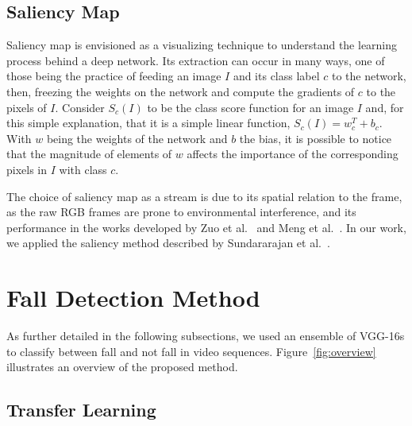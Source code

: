 \documentclass[conference]{IEEEtran}
\begin{document}
\subsection{Saliency Map}
\label{sec:saliency}

Saliency map is envisioned as a visualizing technique to understand the learning process behind a deep network. Its extraction can occur in many ways, one of those being the practice of feeding an image $I$ and its class label $c$ to the network, then, freezing the weights on the network and compute the gradients of $c$ to the pixels of $I$. Consider $S_c(I)$ to be the class score function for an image $I$ and, for this simple explanation, that it is a simple linear function, $S_c(I) = w_c^T + b_c$. With $w$ being the weights of the network and $b$ the bias, it is possible to notice that the magnitude of elements of $w$ affects the importance of the corresponding pixels in $I$ with class $c$.\par
The choice of saliency map as a stream is due to its spatial relation to the frame, as the raw RGB frames are prone to environmental interference, and its performance in the works developed by Zuo et al.~\cite{zuo2019enhanced} and Meng et al.~\cite{Meng2018interpretable}. In our work, we applied the saliency method described by Sundararajan et al.~\cite{sundararajan2017axiomatic}.

\section{Fall Detection Method}
\label{sec:method}

As further detailed in the following subsections, we used an ensemble of VGG-16s to classify between fall and not fall in video sequences. Figure~\ref{fig:overview} illustrates an overview of the proposed method.

\subsection{Transfer Learning}
\end{document}
